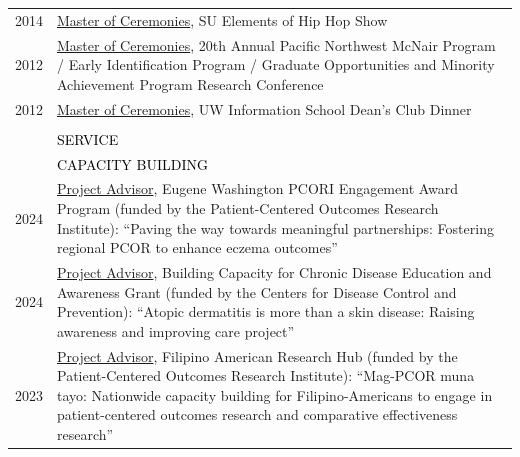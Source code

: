 \documentclass[12pt]{article}
\begin{document}
{\begin{longtable}{R{0.75in}p{5.0in}}
\footnotesize{2014} & \href{https://www.facebook.com/events/1495108147408350/}{Master of Ceremonies}, SU Elements of Hip Hop Show\\

\footnotesize{2012} & \href{https://www.washington.edu/omad/2012/05/14/undergraduates-to-present-research-at-20th-annual-pacific-northwest-mcnaireipgo-map-research-conference-may-17-19/}{Master of Ceremonies}, 20th Annual Pacific Northwest McNair Program / Early Identification Program / Graduate Opportunities and Minority Achievement Program Research Conference\\

\footnotesize{2012} & \href{https://youtu.be/WMPhe6H7yiM}{Master of Ceremonies}, UW Information School Dean's Club Dinner\\\\

\sout{\hfill} 
& \par \Large \textcolor{black}{\uppercase{Service\hspace{6pt} \sout{\hfill}}} \medskip \\

& \large \textcolor{black}{\uppercase{Capacity Building}}\\
\footnotesize{2024} & \href{https://www.pcori.org/research-results/2023/paving-way-towards-meaningful-partnerships-fostering-regional-pcor-enhance-eczema-outcomes}{Project Advisor}, Eugene Washington PCORI Engagement Award Program (funded by the Patient-Centered Outcomes Research Institute): ``Paving the way towards meaningful partnerships: Fostering regional PCOR to enhance eczema outcomes''\\

\footnotesize{2024} & \href{https://www.cdc.gov/chronic-disease-educational-awareness/php/funding/building-capacity-awardees.html}{Project Advisor}, Building Capacity for Chronic Disease Education and Awareness Grant (funded by the Centers for Disease Control and Prevention): ``Atopic dermatitis is more than a skin disease: Raising awareness and improving care project''\\

\footnotesize{2023} & \href{https://www.pcori.org/research-results/2019/mag-pcor-muna-tayo-nationwide-capacity-building-filipino-americans-engage-pcor-and-cer}{Project Advisor}, Filipino American Research Hub (funded by the Patient-Centered Outcomes Research Institute): ``Mag-PCOR muna tayo: Nationwide capacity building for Filipino-Americans to engage in patient-centered outcomes research and comparative effectiveness research'' \medskip \\


\end{longtable}}
\end{document}

